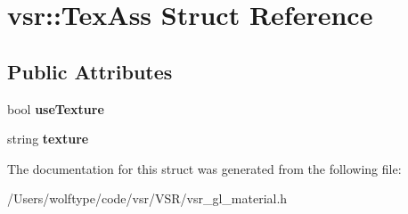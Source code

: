 \hypertarget{structvsr_1_1_tex_ass}{\section{vsr\-:\-:Tex\-Ass Struct Reference}
\label{structvsr_1_1_tex_ass}
}
\subsection*{Public Attributes}
\begin{DoxyCompactItemize}
\item 
\hypertarget{structvsr_1_1_tex_ass_a33fbdd61571bf9af0a920e110f06a9db}{bool {\bfseries use\-Texture}}\label{structvsr_1_1_tex_ass_a33fbdd61571bf9af0a920e110f06a9db}

\item 
\hypertarget{structvsr_1_1_tex_ass_abe07ebc429992e369c0f584c650f6433}{string {\bfseries texture}}\label{structvsr_1_1_tex_ass_abe07ebc429992e369c0f584c650f6433}

\end{DoxyCompactItemize}


The documentation for this struct was generated from the following file\-:\begin{DoxyCompactItemize}
\item 
/\-Users/wolftype/code/vsr/\-V\-S\-R/vsr\-\_\-gl\-\_\-material.\-h\end{DoxyCompactItemize}
